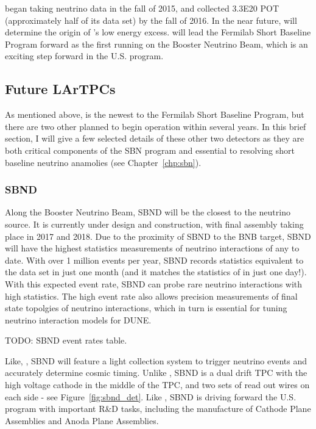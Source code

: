 \uboone began taking neutrino data in the fall of 2015, and collected 3.3E20 POT (approximately half of its data set) by the fall of 2016.  In the near future, \uboone will determine the origin of \MB's low energy excess.  \uboone will lead the Fermilab Short Baseline Program forward as the first running \lartpc on the Booster Neutrino Beam, which is an exciting step forward in the U.S. \lartpc program.

\subsection{\label{sec:future_tpcs} Future LArTPCs}

As mentioned above, \uboone is the newest \lartpc to the Fermilab Short Baseline Program, but there are two other \lartpcs planned to begin operation within several years.  In this brief section, I will give a few selected details of these other two detectors as they are both critical components of the SBN program and essential to resolving short baseline neutrino anamolies (see Chapter~\ref{chp:sbn}).

\subsubsection{\label{subsec:sbnd} SBND}

Along the Booster Neutrino Beam, SBND will be the \lartpc closest to the neutrino source.  It is currently under design and construction, with final assembly taking place in 2017 and 2018.  Due to the proximity of SBND to the BNB target, SBND will have the highest statistics measurements of neutrino interactions of any \lartpc to date.  With over 1 million events per year, SBND records statistics equivalent to the \uboone data set in just one month (and it matches the statistics of \argoneut in just one day!).  With this expected event rate, SBND can probe rare neutrino interactions with high statistics.  The high event rate also allows precision measurements of final state topolgies of neutrino interactions, which in turn is essential for tuning neutrino interaction models for DUNE.

TODO: SBND event rates table.

Like, \uboone, SBND will feature a light collection system to trigger neutrino events and accurately determine cosmic timing.  Unlike \uboone, SBND is a dual drift TPC with the high voltage cathode in the middle of the TPC, and two sets of read out wires on each side - see Figure~\ref{fig:sbnd_det}.  Like \uboone, SBND is driving forward the U.S. \lartpc program with important R\&D tasks, including the manufacture of Cathode Plane Assemblies and Anoda Plane Assemblies.

